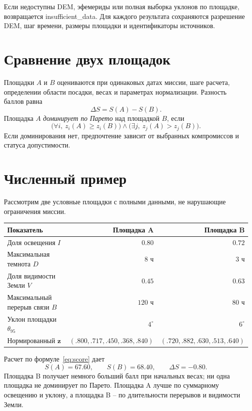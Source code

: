 \documentclass[10pt,a4paper]{article}
\newcommand{\code}[1]{{\ttfamily\small #1}}
\begin{document}
Если недоступны DEM, эфемериды или полная выборка уклонов по площадке, возвращается \code{insufficient\_data}. Для каждого результата сохраняются разрешение DEM, шаг времени, размеры площадки и идентификаторы источников.

\section{Сравнение двух площадок}
Площадки $A$ и $B$ оцениваются при одинаковых датах миссии, шаге расчета, определении области посадки, весах и параметрах нормализации. Разность баллов равна
\begin{equation}
\Delta S=S(A)-S(B).
\end{equation}
Площадка $A$ \emph{доминирует по Парето} над площадкой $B$, если
\begin{equation}
\bigl(\forall i,\ z_i(A)\geq z_i(B)\bigr)
\land
\bigl(\exists j,\ z_j(A)>z_j(B)\bigr).
\end{equation}
Если доминирования нет, предпочтение зависит от выбранных компромиссов и статуса допустимости.

\section{Численный пример}
Рассмотрим две условные площадки с полными данными, не нарушающие ограничения миссии.

\begin{center}
\small
\begin{tabular}{@{}lrr@{}}
\toprule
\textbf{Показатель} & \textbf{Площадка A} & \textbf{Площадка B}\\
\midrule
Доля освещения $I$ & $0.80$ & $0.72$\\
Максимальная темнота $D$ & $8$ ч & $3$ ч\\
Доля видимости Земли $V$ & $0.45$ & $0.63$\\
Максимальный перерыв связи $B$ & $120$ ч & $80$ ч\\
Уклон площадки $\theta_{95}$ & $4^\circ$ & $6^\circ$\\
\midrule
Нормированный $\boldsymbol{z}$ & $(.800,.717,.450,.368,.840)$ & $(.720,.882,.630,.513,.640)$\\
\bottomrule
\end{tabular}
\end{center}
Расчет по формуле~\eqref{eq:score} дает
\begin{equation}
S(A)=67.60,\qquad S(B)=68.40,\qquad \Delta S=-0.80.
\end{equation}
Площадка B получает немного больший балл при начальных весах; ни одна площадка не доминирует по Парето. Площадка A лучше по суммарному освещению и уклону, а площадка B -- по длительности перерывов и видимости Земли.
\end{document}

